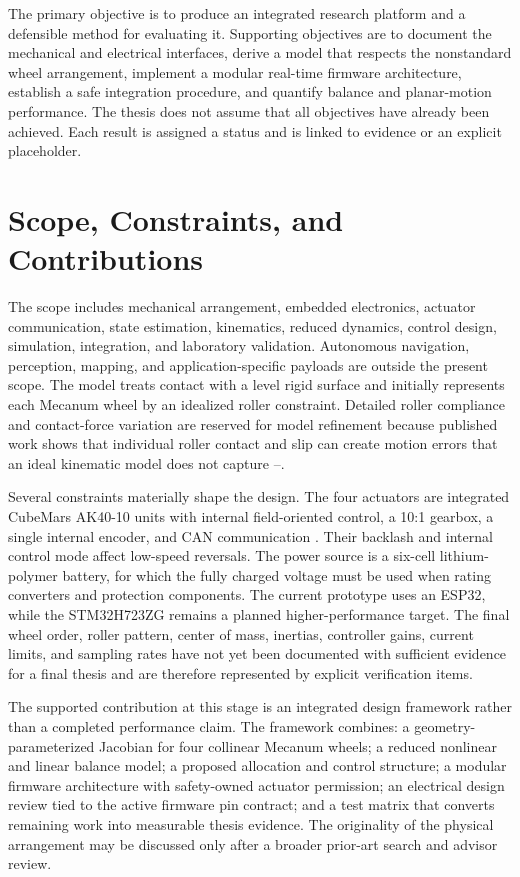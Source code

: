 The primary objective is to produce an integrated research platform and
a defensible method for evaluating it. Supporting objectives are to
document the mechanical and electrical interfaces, derive a model that
respects the nonstandard wheel arrangement, implement a modular
real-time firmware architecture, establish a safe integration procedure,
and quantify balance and planar-motion performance. The thesis does not
assume that all objectives have already been achieved. Each result is
assigned a status and is linked to evidence or an explicit placeholder.

\section{Scope, Constraints, and Contributions}\label{scope-constraints-and-contributions}

The scope includes mechanical arrangement, embedded electronics,
actuator communication, state estimation, kinematics, reduced dynamics,
control design, simulation, integration, and laboratory validation.
Autonomous navigation, perception, mapping, and application-specific
payloads are outside the present scope. The model treats contact with a
level rigid surface and initially represents each Mecanum wheel by an
idealized roller constraint. Detailed roller compliance and
contact-force variation are reserved for model refinement because
published work shows that individual roller contact and slip can create
motion errors that an ideal kinematic model does not capture
\cite{bayar2020contact}--\cite{barcenas2025robust}.

Several constraints materially shape the design. The four actuators are
integrated CubeMars AK40-10 units with internal field-oriented control,
a 10:1 gearbox, a single internal encoder, and CAN communication
\cite{cubemars2026ak4010}. Their backlash and internal control mode affect low-speed
reversals. The power source is a six-cell lithium-polymer battery, for
which the fully charged voltage must be used when rating converters and
protection components. The current prototype uses an ESP32, while the
STM32H723ZG remains a planned higher-performance target. The final wheel
order, roller pattern, center of mass, inertias, controller gains,
current limits, and sampling rates have not yet been documented with
sufficient evidence for a final thesis and are therefore represented by
explicit verification items.

The supported contribution at this stage is an integrated design
framework rather than a completed performance claim. The framework
combines: a geometry-parameterized Jacobian for four collinear Mecanum
wheels; a reduced nonlinear and linear balance model; a proposed
allocation and control structure; a modular firmware architecture with
safety-owned actuator permission; an electrical design review tied to
the active firmware pin contract; and a test matrix that converts
remaining work into measurable thesis evidence. The originality of the
physical arrangement may be discussed only after a broader prior-art
search and advisor review.

